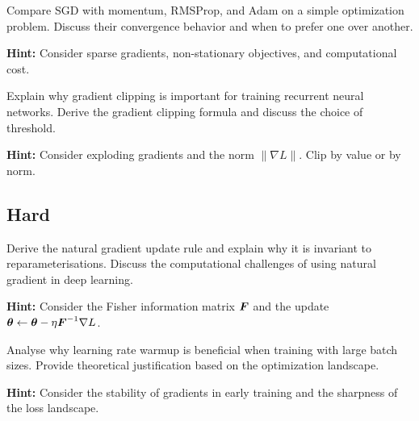 \begin{problem}
Compare SGD with momentum, RMSProp, and Adam on a simple optimization problem. Discuss their convergence behavior and when to prefer one over another.

\textbf{Hint:} Consider sparse gradients, non-stationary objectives, and computational cost.
\end{problem}

\begin{problem}
Explain why gradient clipping is important for training recurrent neural networks. Derive the gradient clipping formula and discuss the choice of threshold.

\textbf{Hint:} Consider exploding gradients and the norm $\|\nabla L\|$. Clip by value or by norm.
\end{problem}

\subsection*{Hard}

\begin{problem}
Derive the natural gradient update rule and explain why it is invariant to reparameterisations. Discuss the computational challenges of using natural gradient in deep learning.

\textbf{Hint:} Consider the Fisher information matrix $\boldsymbol{F}$ and the update $\boldsymbol{\theta} \leftarrow \boldsymbol{\theta} - \eta \boldsymbol{F}^{-1} \nabla L$.
\end{problem}

\begin{problem}
Analyse why learning rate warmup is beneficial when training with large batch sizes. Provide theoretical justification based on the optimization landscape.

\textbf{Hint:} Consider the stability of gradients in early training and the sharpness of the loss landscape.
\end{problem}

